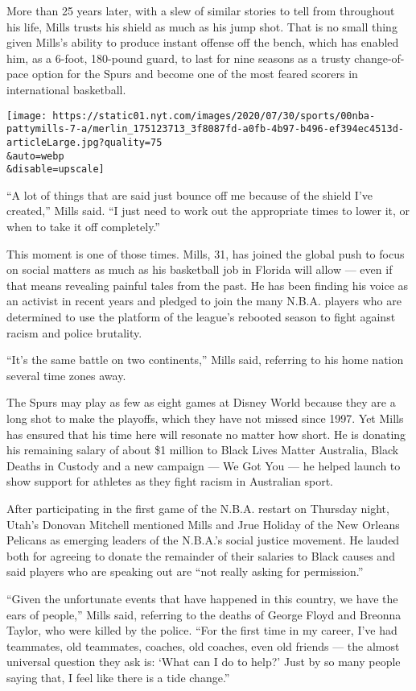 More than 25 years later, with a slew of similar stories to tell from
throughout his life, Mills trusts his shield as much as his jump shot.
That is no small thing given Mills's ability to produce instant offense
off the bench, which has enabled him, as a 6-foot, 180-pound guard, to
last for nine seasons as a trusty change-of-pace option for the Spurs
and become one of the most feared scorers in international basketball.

\texttt{[image: https://static01.nyt.com/images/2020/07/30/sports/00nba-pattymills-7-a/merlin\_175123713\_3f8087fd-a0fb-4b97-b496-ef394ec4513d-articleLarge.jpg?quality=75\\\&auto=webp\\\&disable=upscale]}

``A lot of things that are said just bounce off me because of the shield
I've created,'' Mills said. ``I just need to work out the appropriate
times to lower it, or when to take it off completely.''

This moment is one of those times. Mills, 31, has joined the global push
to focus on social matters as much as his basketball job in Florida will
allow --- even if that means revealing painful tales from the past. He
has been finding his voice as an activist in recent years and pledged to
join the many N.B.A. players who are determined to use the platform of
the league's rebooted season to fight against racism and police
brutality.

``It's the same battle on two continents,'' Mills said, referring to his
home nation several time zones away.

The Spurs may play as few as eight games at Disney World because they
are a long shot to make the playoffs, which they have not missed since
1997. Yet Mills has ensured that his time here will resonate no matter
how short. He is donating his remaining salary of about \$1 million to
Black Lives Matter Australia, Black Deaths in Custody and a new campaign
--- We Got You --- he helped launch to show support for athletes as they
fight racism in Australian sport.

After participating in the first game of the N.B.A. restart on Thursday
night, Utah's Donovan Mitchell mentioned Mills and Jrue Holiday of the
New Orleans Pelicans as emerging leaders of the N.B.A.'s social justice
movement. He lauded both for agreeing to donate the remainder of their
salaries to Black causes and said players who are speaking out are ``not
really asking for permission.''

``Given the unfortunate events that have happened in this country, we
have the ears of people,'' Mills said, referring to the deaths of George
Floyd and Breonna Taylor, who were killed by the police. ``For the first
time in my career, I've had teammates, old teammates, coaches, old
coaches, even old friends --- the almost universal question they ask is:
`What can I do to help?' Just by so many people saying that, I feel like
there is a tide change.''

